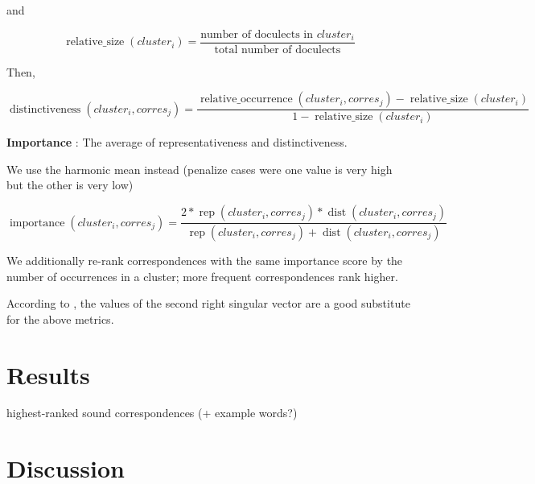 \documentclass{article}
\begin{document}
and

\begin{equation*}
\operatorname{relative\_size}(cluster_i) = 
\frac{\text{number of doculects in } cluster_i}
{\text{total number of doculects}}
\end{equation*}

Then, 

\begin{equation*}
\operatorname{distinctiveness}(cluster_i, corres_j) = 
\frac{\operatorname{relative\_occurrence}(cluster_i, corres_j) - \operatorname{relative\_size}(cluster_i)}
{1 - \operatorname{relative\_size}(cluster_i)}
\end{equation*}

\textbf{Importance}
\citet{wieling2011bipartite}: 
The average of representativeness and distinctiveness.

We use the harmonic mean instead (penalize cases were one value is very high but the other is very low)

\begin{equation*}
\operatorname{importance}(cluster_i, corres_j) = 
\frac{
2 * \operatorname{rep}(cluster_i, corres_j) * \operatorname{dist}(cluster_i, corres_j)}
{\operatorname{rep}(cluster_i, corres_j) + \operatorname{dist}(cluster_i, corres_j)}
\end{equation*}

We additionally re-rank correspondences with the same importance score by the number of occurrences in a cluster; more frequent correspondences rank higher.


According to \citet{wieling2010hierarchical}, the values of the second right singular vector are a good substitute for the above metrics.

\section{Results}


highest-ranked sound correspondences
(+ example words?)

\section{Discussion}
\end{document}
